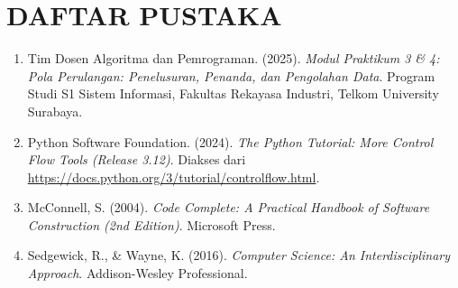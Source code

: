 \documentclass[12pt,a4paper]{article}
\begin{document}
\section{DAFTAR PUSTAKA}

\begin{enumerate}
    \item Tim Dosen Algoritma dan Pemrograman. (2025). \textit{Modul Praktikum 3 \& 4: Pola Perulangan: Penelusuran, Penanda, dan Pengolahan Data}. Program Studi S1 Sistem Informasi, Fakultas Rekayasa Industri, Telkom University Surabaya.

    \item Python Software Foundation. (2024). \textit{The Python Tutorial: More Control Flow Tools (Release 3.12)}. Diakses dari \url{https://docs.python.org/3/tutorial/controlflow.html}.

    \item McConnell, S. (2004). \textit{Code Complete: A Practical Handbook of Software Construction (2nd Edition)}. Microsoft Press.

    \item Sedgewick, R., \& Wayne, K. (2016). \textit{Computer Science: An Interdisciplinary Approach}. Addison-Wesley Professional.
\end{enumerate}
\end{document}
